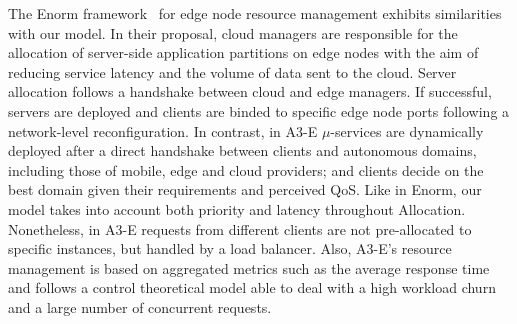 The Enorm framework~\cite{wang2017enorm} for edge node resource management exhibits similarities with our model. In their proposal, cloud managers are responsible for the allocation of server-side application partitions on edge nodes with the aim of reducing service latency and the volume of data sent to the cloud. Server allocation follows a handshake between cloud and edge managers. If successful, servers are deployed and clients are binded to specific edge node ports following a network-level reconfiguration. In contrast, in A3-E $\mu$-services are dynamically deployed after a direct handshake between clients and autonomous domains, including those of mobile, edge and cloud providers; and clients decide on the best domain given their requirements and perceived QoS. Like in Enorm, our model takes into account both priority and latency throughout Allocation. Nonetheless, in A3-E requests from different clients are not pre-allocated to specific instances, but handled by a load balancer. Also, A3-E's resource management is based on aggregated metrics such as the average response time and follows a control theoretical model able to deal with a high workload churn and a large number of concurrent requests. 




